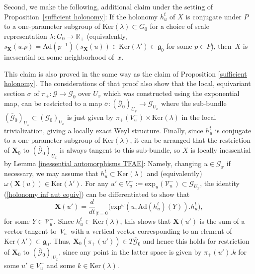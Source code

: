 \documentclass[11pt]{article}
\def\R{\mathbb{R}}
\def\g{\mathfrak{g}}
\def\Gbdle{\mathcal{G}}
\theoremstyle{plain}
\theoremstyle{definition}
\begin{document}
Second, we make the following, additional claim under the setting of Proposition~\ref{sufficient holonomy}: If the holonomy $h_u^t$ of $X$ is conjugate under $P$ to a one-parameter subgroup of $\mathrm{Ker}(\lambda) \subset G_0$ for a choice of scale representation $\lambda: G_0 \rightarrow \R_+$ (equivalently, $s_{\mathbf{X}}(u.p) = \mathrm{Ad}(p^{-1})(s_{\mathbf{X}}(u)) \in \mathrm{Ker}(\lambda') \subset \g_0$ for some $p \in P$), then~$X$ is inessential on some neighborhood of~$x$.

This claim is also proved in the same way as the claim of Proposition \ref{sufficient holonomy}. The considerations of that proof also show that the local, equivariant section $\sigma$ of $\pi_+: \Gbdle \rightarrow \Gbdle_0$ over $U_x$ which was constructed using the exponential map, can be restricted to a map $\overline{\sigma}: (\overline{\Gbdle}_0)_{U_x} \rightarrow \Gbdle_{U_x}$ where the sub-bundle $(\overline{\Gbdle}_0)_{U_x} \subset (\Gbdle_0)_{U_x}$ is just given by $\pi_+(V_u^-) \times \mathrm{Ker}(\lambda)$ in the local trivialization, giving a locally exact Weyl structure. Finally, since $h_u^t$ is conjugate to a one-parameter subgroup of $\mathrm{Ker}(\lambda)$, it can be arranged that the restriction of $\mathbf{X}_0$ to $(\overline{\Gbdle}_0)_{U_x}$ is always tangent to this sub-bundle, so $X$ is locally inessential by Lemma \ref{inessential automorphisms TFAE}: Namely, changing $u \in \Gbdle_x$ if necessary, we may assume that $h_u^t \subset \mathrm{Ker}(\lambda)$ and (equivalently) $\omega(\mathbf{X}(u)) \in \mathrm{Ker}(\lambda')$. For any $u' \in V_u^- := \mathrm{exp}_u(\mathcal{V}_u^-) \subset \Gbdle_{U_x}$, the identity (\ref{holonomy inf aut equiv}) can be dif\/ferentiated to show that
\[
\mathbf{X}(u') = \frac{d}{dt}_{\vert t=0}\big(\mathrm{exp}^{\omega}(u,\mathrm{Ad}(h_u^t)(Y)).h_u^t\big),
\]
for some $Y \in \mathcal{V}_u^-$. Since $h_u^t \subset \mathrm{Ker}(\lambda)$, this shows that $\mathbf{X}(u')$ is the sum of a vector tangent to~$V_u^-$ with a vertical vector corresponding to an element of $\mathrm{Ker}(\lambda') \subset \g_0$. Thus, $\mathbf{X}_0(\pi_+(u')) \in T\overline{\Gbdle}_0$ and hence this holds for restriction of $\mathbf{X}_0$ to $(\overline{\Gbdle}_0)_{\vert U_x}$, since any point in the latter space is given by $\pi_+(u').k$ for some $u' \in V_u^-$ and some $k \in \mathrm{Ker}(\lambda)$.
\end{document}
